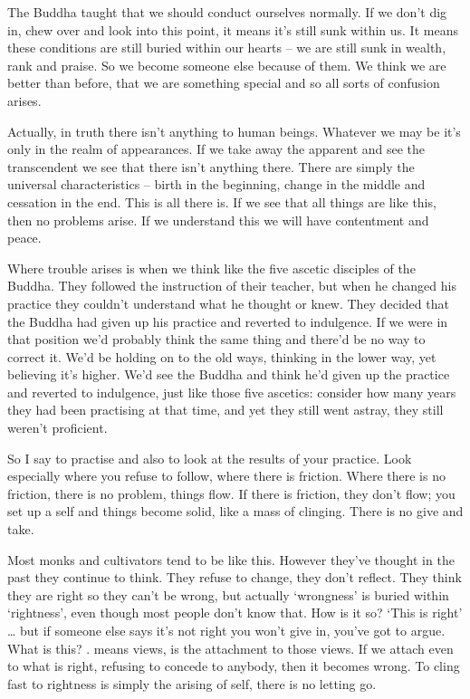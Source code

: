 The Buddha taught that we should conduct ourselves normally. If we don't dig in, chew over and look into this point, it means it's still sunk within us. It means these conditions are still buried within our hearts -- we are still sunk in wealth, rank and praise. So we become someone else because of them. We think we are better than before, that we are something special and so all sorts of confusion arises.

Actually, in truth there isn't anything to human beings. Whatever we may be it's only in the realm of appearances. If we take away the apparent and see the transcendent we see that there isn't anything there. There are simply the universal characteristics -- birth in the beginning, change in the middle and cessation in the end. This is all there is. If we see that all things are like this, then no problems arise. If we understand this we will have contentment and peace.

Where trouble arises is when we think like the five ascetic disciples of the Buddha. They followed the instruction of their teacher, but when he changed his practice they couldn't understand what he thought or knew. They decided that the Buddha had given up his practice and reverted to indulgence. If we were in that position we'd probably think the same thing and there'd be no way to correct it. We'd be holding on to the old ways, thinking in the lower way, yet believing it's higher. We'd see the Buddha and think he'd given up the practice and reverted to indulgence, just like those five ascetics: consider how many years they had been practising at that time, and yet they still went astray, they still weren't proficient.

So I say to practise and also to look at the results of your practice. Look especially where you refuse to follow, where there is friction. Where there is no friction, there is no problem, things flow. If there is friction, they don't flow; you set up a self and things become solid, like a mass of clinging. There is no give and take.

Most monks and cultivators tend to be like this. However they've thought in the past they continue to think. They refuse to change, they don't reflect. They think they are right so they can't be wrong, but actually `wrongness' is buried within `rightness', even though most people don't know that. How is it so? `This is right' \ldots{} but if someone else says it's not right you won't give in, you've got to argue. What is this? .  means views,  is the attachment to those views. If we attach even to what is right, refusing to concede to anybody, then it becomes wrong. To cling fast to rightness is simply the arising of self, there is no letting go.


